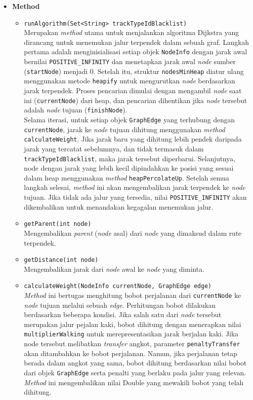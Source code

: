 \begin{itemize}
    \item \textbf{Method}
    \begin{itemize}
        \item \texttt{runAlgorithm(Set<String> trackTypeIdBlacklist)}
        \\ Merupakan \textit{method} utama untuk menjalankan algoritma Dijkstra yang dirancang untuk menemukan jalur terpendek dalam sebuah graf. Langkah pertama adalah menginisialisasi setiap objek \texttt{NodeInfo} dengan jarak awal bernilai \texttt{POSITIVE\_INFINITY} dan menetapkan jarak awal \textit{node} sumber (\texttt{startNode}) menjadi 0. Setelah itu, struktur \texttt{nodesMinHeap} diatur ulang menggunakan metode \texttt{heapify} untuk mengurutkan \textit{node} berdasarkan jarak terpendek. Proses pencarian dimulai dengan mengambil \textit{node} saat ini (\texttt{currentNode}) dari heap, dan pencarian dihentikan jika \textit{node} tersebut adalah \textit{node} tujuan (\texttt{finishNode}).
        \\ Selama iterasi, untuk setiap objek \texttt{GraphEdge} yang terhubung dengan \texttt{currentNode}, jarak ke \textit{node} tujuan dihitung menggunakan \textit{method} \texttt{calculateWeight}. Jika jarak baru yang dihitung lebih pendek daripada jarak yang tercatat sebelumnya, dan tidak termasuk dalam \texttt{trackTypeIdBlacklist}, maka jarak tersebut diperbarui. Selanjutnya, node dengan jarak yang lebih kecil dipindahkan ke posisi yang sesuai dalam heap menggunakan \textit{method} \texttt{heapPercolateUp}. Setelah semua langkah selesai, \textit{method} ini akan mengembalikan jarak terpendek ke \textit{node} tujuan. Jika tidak ada jalur yang tersedia, nilai \texttt{POSITIVE\_INFINITY} akan dikembalikan untuk menandakan kegagalan menemukan jalur.
        \item \texttt{getParent(int node)}
        \\ Mengembalikan \textit{parent} (\textit{node} asal) dari \textit{node} yang dimaksud dalam rute terpendek.
        \item \texttt{getDistance(int node)}
        \\ Mengembalikan jarak dari \textit{node} awal ke \textit{node} yang diminta.
        \item \texttt{calculateWeight(NodeInfo currentNode, GraphEdge edge)}
        \\ \textit{Method} ini bertugas menghitung bobot perjalanan dari \texttt{currentNode} ke \textit{node} tujuan melalui sebuah \textit{edge}. Perhitungan bobot dilakukan berdasarkan beberapa kondisi. Jika salah satu dari \textit{node} tersebut merupakan jalur pejalan kaki, bobot dihitung dengan menerapkan nilai \texttt{multiplierWalking} untuk merepresentasikan jarak berjalan kaki. Jika node tersebut melibatkan \textit{transfer} angkot, parameter \texttt{penaltyTransfer} akan ditambahkan ke bobot perjalanan. Namun, jika perjalanan tetap berada dalam angkot yang sama, bobot dihitung berdasarkan nilai bobot dari objek \texttt{GraphEdge} serta penalti yang berlaku pada jalur yang relevan. \textit{Method} ini mengembalikan nilai Double yang mewakili bobot yang telah dihitung.

\end{itemize}
\end{itemize}
